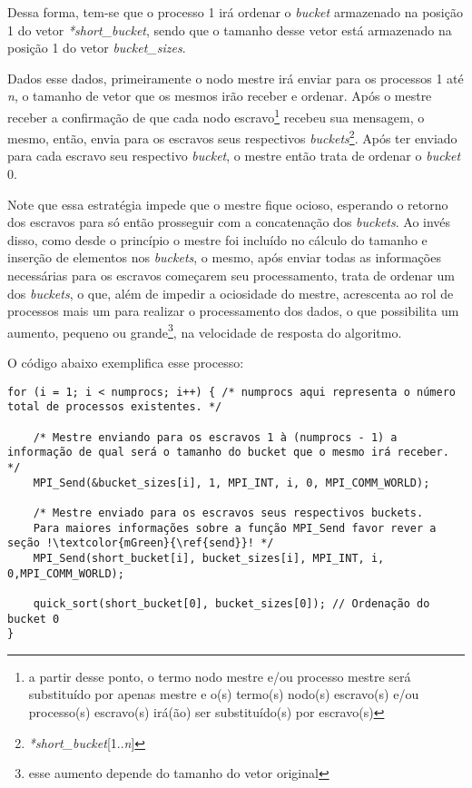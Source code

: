 			Dessa forma, tem-se que o processo 1 irá ordenar o \textit{bucket} armazenado na posição 1 do vetor \textit{*short\_bucket}, sendo que o tamanho desse vetor está armazenado na posição 1 do vetor \textit{bucket\_sizes}.
			
			Dados esse dados, primeiramente o nodo mestre irá enviar para os processos 1 até \textit{n}, o tamanho de vetor que os mesmos irão receber e ordenar. Após o mestre receber a confirmação de que cada nodo escravo\footnote{a partir desse ponto, o termo nodo mestre e/ou processo mestre será substituído por apenas mestre e o(s) termo(s) nodo(s) escravo(s) e/ou processo(s) escravo(s) irá(ão) ser substituído(s) por escravo(s)} recebeu sua mensagem, o mesmo, então, envia para os escravos seus respectivos \textit{buckets}\footnote{\textit{*short\_bucket}[1..\textit{n}]}. Após ter enviado para cada escravo seu respectivo \textit{bucket}, o mestre então trata de ordenar o \textit{bucket} 0. 

			Note que essa estratégia impede que o mestre fique ocioso, esperando o retorno dos escravos para só então prosseguir com a concatenação dos \textit{buckets}.	Ao invés disso, como desde o princípio o mestre foi incluído no cálculo do tamanho e inserção de elementos nos \textit{buckets}, o mesmo, após enviar todas as informações necessárias para os escravos começarem seu processamento, trata de ordenar um dos \textit{buckets}, o que, além de impedir a ociosidade do mestre, acrescenta ao rol de processos mais um para realizar o processamento dos dados, o que possibilita um aumento, pequeno ou grande\footnote{esse aumento depende do tamanho do vetor original}, na velocidade de resposta do algoritmo.
		
			O código abaixo exemplifica esse processo:			
			\newpage
			\begin{lstlisting}[style=C]		
for (i = 1; i < numprocs; i++) { /* numprocs aqui representa o número total de processos existentes. */

	/* Mestre enviando para os escravos 1 à (numprocs - 1) a informação de qual será o tamanho do bucket que o mesmo irá receber. */
	MPI_Send(&bucket_sizes[i], 1, MPI_INT, i, 0, MPI_COMM_WORLD); 

	/* Mestre enviado para os escravos seus respectivos buckets.
	Para maiores informações sobre a função MPI_Send favor rever a seção !\textcolor{mGreen}{\ref{send}}! */
	MPI_Send(short_bucket[i], bucket_sizes[i], MPI_INT, i, 0,MPI_COMM_WORLD);
	
	quick_sort(short_bucket[0], bucket_sizes[0]); // Ordenação do bucket 0
}
\end{lstlisting}
			
